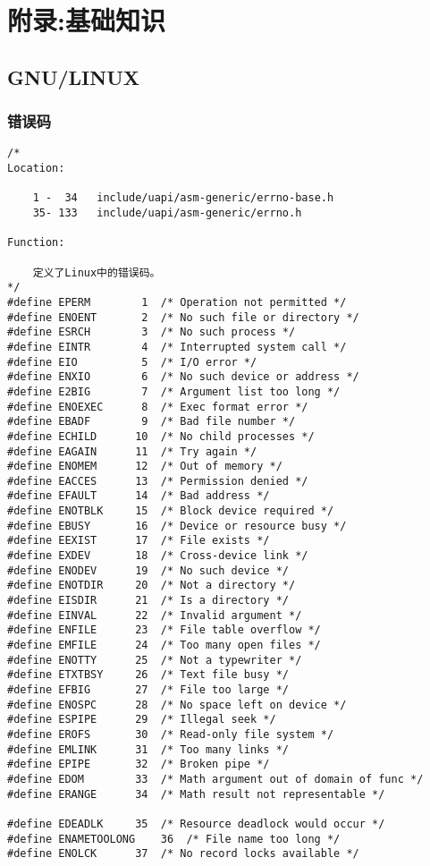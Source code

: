 \chapter{附录:基础知识}

\minitoc
	\section{GNU/LINUX}
		\subsection{错误码}
\begin{verbatim}
/*
Location:

	1 -  34   include/uapi/asm-generic/errno-base.h
	35- 133	  include/uapi/asm-generic/errno.h

Function:

	定义了Linux中的错误码。
*/
#define	EPERM		 1	/* Operation not permitted */
#define	ENOENT		 2	/* No such file or directory */
#define	ESRCH		 3	/* No such process */
#define	EINTR		 4	/* Interrupted system call */
#define	EIO		 	 5	/* I/O error */
#define	ENXIO		 6	/* No such device or address */
#define	E2BIG		 7	/* Argument list too long */
#define	ENOEXEC		 8	/* Exec format error */
#define	EBADF		 9	/* Bad file number */
#define	ECHILD		10	/* No child processes */
#define	EAGAIN		11	/* Try again */
#define	ENOMEM		12	/* Out of memory */
#define	EACCES		13	/* Permission denied */
#define	EFAULT		14	/* Bad address */
#define	ENOTBLK		15	/* Block device required */
#define	EBUSY		16	/* Device or resource busy */
#define	EEXIST		17	/* File exists */
#define	EXDEV		18	/* Cross-device link */
#define	ENODEV		19	/* No such device */
#define	ENOTDIR		20	/* Not a directory */
#define	EISDIR		21	/* Is a directory */
#define	EINVAL		22	/* Invalid argument */
#define	ENFILE		23	/* File table overflow */
#define	EMFILE		24	/* Too many open files */
#define	ENOTTY		25	/* Not a typewriter */
#define	ETXTBSY		26	/* Text file busy */
#define	EFBIG		27	/* File too large */
#define	ENOSPC		28	/* No space left on device */
#define	ESPIPE		29	/* Illegal seek */
#define	EROFS		30	/* Read-only file system */
#define	EMLINK		31	/* Too many links */
#define	EPIPE		32	/* Broken pipe */
#define	EDOM		33	/* Math argument out of domain of func */
#define	ERANGE		34	/* Math result not representable */

#define	EDEADLK		35	/* Resource deadlock would occur */
#define	ENAMETOOLONG	36	/* File name too long */
#define	ENOLCK		37	/* No record locks available */


\end{verbatim}
